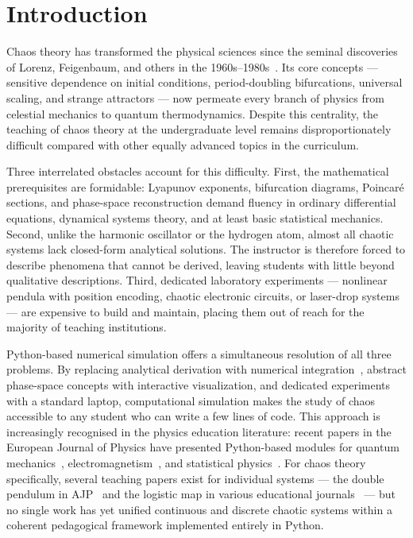 \documentclass[aps,twocolumn,showpacs]{revtex4-2}
\begin{document}
\section{Introduction}

Chaos theory has transformed the physical sciences since the seminal discoveries of Lorenz, Feigenbaum,
and others in the 1960s--1980s~\cite{Lorenz1963,Feigenbaum1978,Strogatz2018}. Its core concepts --- sensitive
dependence on initial conditions, period-doubling bifurcations, universal scaling, and strange attractors ---
now permeate every branch of physics from celestial mechanics to quantum thermodynamics. Despite this
centrality, the teaching of chaos theory at the undergraduate level remains disproportionately difficult
compared with other equally advanced topics in the curriculum.

Three interrelated obstacles account for this difficulty. First, the mathematical prerequisites are
formidable: Lyapunov exponents, bifurcation diagrams, Poincar\'e sections, and phase-space reconstruction
demand fluency in ordinary differential equations, dynamical systems theory, and at least basic statistical
mechanics. Second, unlike the harmonic oscillator or the hydrogen atom, almost all chaotic systems lack
closed-form analytical solutions. The instructor is therefore forced to describe phenomena that cannot be
derived, leaving students with little beyond qualitative descriptions. Third, dedicated laboratory experiments
--- nonlinear pendula with position encoding, chaotic electronic circuits, or laser-drop
systems~\cite{Krese2011} --- are expensive to build and maintain, placing them out of reach for the majority
of teaching institutions.

Python-based numerical simulation offers a simultaneous resolution of all three problems. By replacing
analytical derivation with numerical integration~\cite{Virtanen2020}, abstract phase-space concepts with
interactive visualization, and dedicated experiments with a standard laptop, computational simulation makes
the study of chaos accessible to any student who can write a few lines of code. This approach is increasingly
recognised in the physics education literature: recent papers in the European Journal of Physics have
presented Python-based modules for quantum mechanics~\cite{Singh2023}, electromagnetism~\cite{Gonzalez2022},
and statistical physics~\cite{Oliveira2023}. For chaos theory specifically, several teaching papers exist for
individual systems --- the double pendulum in AJP~\cite{Shinbrot2005,Levien2013} and the logistic map in
various educational journals~\cite{Ramirez2021} --- but no single work has yet unified continuous and
discrete chaotic systems within a coherent pedagogical framework implemented entirely in Python.
\end{document}
